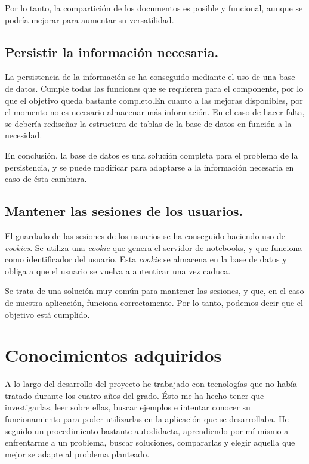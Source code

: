 \documentclass[11pt,spanish,listoffigures,listoftables]{tfgetsinf}
\begin{document}
Por lo tanto, la compartición de los documentos es posible y funcional, aunque se podría mejorar para aumentar su versatilidad.

\subsection{Persistir la información necesaria.}
\label{subsec:objetivos-conc-persistir}

La persistencia de la información se ha conseguido mediante el uso de una base de datos. Cumple todas las funciones que se requieren para el componente, por lo que el objetivo queda bastante completo.En cuanto a las mejoras disponibles, por el momento no es necesario almacenar más información. En el caso de hacer falta, se debería rediseñar la estructura de tablas de la base de datos en función a la necesidad. 

En conclusión, la base de datos es una solución completa para el problema de la persistencia, y se puede modificar para adaptarse a la información necesaria en caso de ésta cambiara.

\subsection{Mantener las sesiones de los usuarios.}
\label{subsec:objetivos-conc-session}

El guardado de las sesiones de los usuarios se ha conseguido haciendo uso de \textit{cookies}. Se utiliza una \textit{cookie} que genera el servidor de notebooks, y que funciona como identificador del usuario. Esta \textit{cookie} se almacena en la base de datos y obliga a que el usuario se vuelva a autenticar una vez caduca.

Se trata de una solución muy común para mantener las sesiones, y que, en el caso de nuestra aplicación, funciona correctamente. Por lo tanto, podemos decir que el objetivo está cumplido.



\section{Conocimientos adquiridos}
\label{sec:conocimientos-adquiridos}

A lo largo del desarrollo del proyecto he trabajado con tecnologías que no había tratado durante los cuatro años del grado. Ésto me ha hecho tener que investigarlas, leer sobre ellas, buscar ejemplos e intentar conocer su funcionamiento para poder utilizarlas en la aplicación que se desarrollaba. He seguido un procedimiento bastante autodidacta, aprendiendo por mí mismo a enfrentarme a un problema, buscar soluciones, compararlas y elegir aquella que mejor se adapte al problema planteado.
\end{document}
